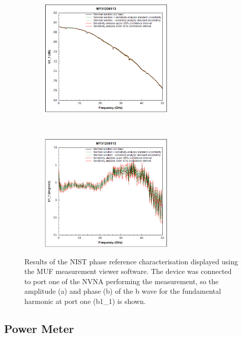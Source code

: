 \documentclass[../thesis/thesis.tex]{subfiles}
\begin{document}
\begin{refsection}
\begin{figure}
	\centering
	\begin{subfigure}{\textwidth}
		\centering
		\includegraphics[width=0.7\textwidth]{combuncA.png}
		\caption{ }
	\end{subfigure}
	\\
	\begin{subfigure}{\textwidth}
		\centering
		\includegraphics[width=0.7\textwidth]{combuncP.png}
		\caption{ }
	\end{subfigure}
	\caption{Results of the NIST phase reference characterisation displayed using the MUF measurement viewer software. The device was connected to port one of the NVNA performing the measurement, so the amplitude (a) and phase (b) of the b wave for the fundamental harmonic at port one (b1\_1) is shown.}
	\label{ch4_fig_combunc}
\end{figure}

\subsection{Power Meter}


\end{refsection}
\end{document}
